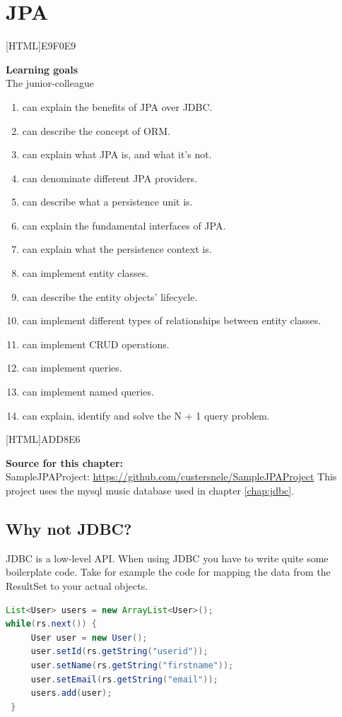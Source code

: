 \chapter{JPA}

[HTML]{E9F0E9}{\parbox{\textwidth}{%
\noindent \textbf{Learning goals}\\
The junior-colleague
\begin{enumerate}[nolistsep]
\item can explain the benefits of JPA over JDBC.
\item can describe the concept of ORM.
\item can explain what JPA is, and what it’s not.
\item can denominate different JPA providers.
\item can describe what a persistence unit is.
\item can explain the fundamental interfaces of JPA.
\item can explain what the persistence context is.
\item can implement entity classes.
\item can describe the entity objects’ lifecycle.
\item can implement different types of relationships between entity classes.
\item can implement CRUD operations.
\item can implement queries.
\item can implement named queries.
\item can explain, identify and solve the N + 1 query problem.
\end{enumerate}}}


[HTML]{ADD8E6}{\parbox{\textwidth}{%
\noindent \textbf{Source for this chapter:}\\
SampleJPAProject: \url{https://github.com/custersnele/SampleJPAProject}
This project uses the mysql music database used in chapter \ref{chap:jdbc}. 
}}

\section{Why not JDBC?}

JDBC is a low-level API. When using JDBC you have to write quite some boilerplate code.
Take for example the code for mapping the data from the ResultSet to your actual objects.

\begin{lstlisting}[frame=single, language=java]
List<User> users = new ArrayList<User>();
while(rs.next()) {
     User user = new User();
     user.setId(rs.getString("userid"));
     user.setName(rs.getString("firstname"));
     user.setEmail(rs.getString("email"));
     users.add(user);
 }
 \end{lstlisting}

